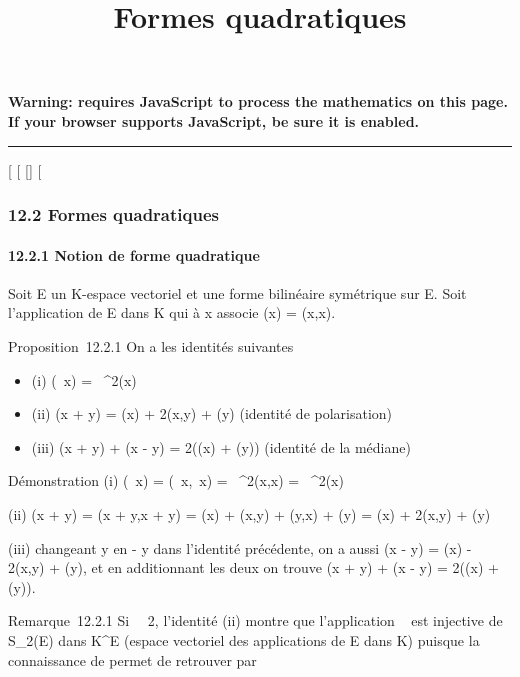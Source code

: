 \documentclass[]{article}
\title{Formes quadratiques}
\author{}
\date{}
\begin{document}
\maketitle

\textbf{Warning: 
requires JavaScript to process the mathematics on this page.\\ If your
browser supports JavaScript, be sure it is enabled.}

\begin{center}\rule{3in}{0.4pt}\end{center}

[
[
[]
[

\subsubsection{12.2 Formes quadratiques}

\paragraph{12.2.1 Notion de forme quadratique}

Soit E un K-espace vectoriel et \phi une forme bilinéaire symétrique sur E.
Soit \Phi l'application de E dans K qui à x associe \Phi(x) = \phi(x,x).

Proposition~12.2.1 On a les identités suivantes

\begin{itemize}
\itemsep1pt\parskip0pt
\item
  (i) \Phi(\lambda~x) = \lambda~^2\Phi(x)
\item
  (ii) \Phi(x + y) = \Phi(x) + 2\phi(x,y) + \Phi(y) (identité de polarisation)
\item
  (iii) \Phi(x + y) + \Phi(x - y) = 2(\Phi(x) + \Phi(y)) (identité de la médiane)
\end{itemize}

Démonstration (i) \Phi(\lambda~x) = \phi(\lambda~x,\lambda~x) = \lambda~^2\phi(x,x) =
\lambda~^2\Phi(x)

(ii) \Phi(x + y) = \phi(x + y,x + y) = \Phi(x) + \phi(x,y) + \phi(y,x) + \Phi(y) = \Phi(x) +
2\phi(x,y) + \Phi(y)

(iii) changeant y en - y dans l'identité précédente, on a aussi \Phi(x - y)
= \Phi(x) - 2\phi(x,y) + \Phi(y), et en additionnant les deux on trouve \Phi(x + y)
+ \Phi(x - y) = 2(\Phi(x) + \Phi(y)).

Remarque~12.2.1 Si
\mathrmcarK\mathrel\neq~~2,
l'identité (ii) montre que l'application \phi\mapsto~\Phi
est injective de S_2(E) dans K^E (espace vectoriel
des applications de E dans K) puisque la connaissance de \Phi permet de
retrouver \phi par
\end{document}
